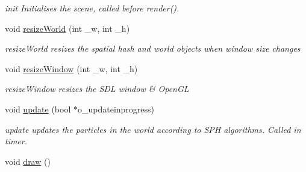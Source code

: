 \begin{DoxyCompactItemize}
\begin{DoxyCompactList}\small\item\em init Initialises the scene, called before render(). \end{DoxyCompactList}\item 
void \hyperlink{classWorld_aed4b52aa267ebcebe7087119529639f3}{resize\-World} (int \-\_\-w, int \-\_\-h)
\begin{DoxyCompactList}\small\item\em resize\-World resizes the spatial hash and world objects when window size changes \end{DoxyCompactList}\item 
void \hyperlink{classWorld_a64d27720442ce140c8095566e8035b54}{resize\-Window} (int \-\_\-w, int \-\_\-h)
\begin{DoxyCompactList}\small\item\em resize\-Window resizes the S\-D\-L window \& Open\-G\-L \end{DoxyCompactList}\item 
void \hyperlink{classWorld_ab3f32d708c9f53e337f8352ac3b0641d}{update} (bool $\ast$o\-\_\-updateinprogress)
\begin{DoxyCompactList}\small\item\em update updates the particles in the world according to S\-P\-H algorithms. Called in timer. \end{DoxyCompactList}\item 
\hypertarget{classWorld_ab51a17ccbb108616daacd0c34973dc8d}{void \hyperlink{classWorld_ab51a17ccbb108616daacd0c34973dc8d}{draw} ()}\label{classWorld_ab51a17ccbb108616daacd0c34973dc8d}


\end{DoxyCompactItemize}
